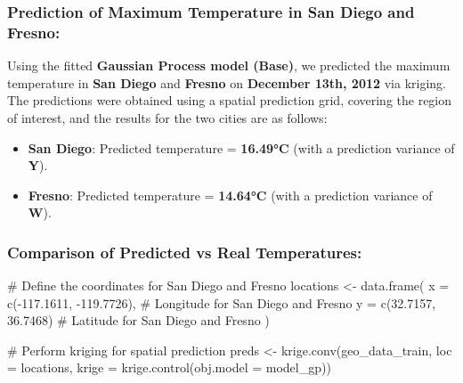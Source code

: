 \documentclass[
  11pt,
]{article}
\newenvironment{Shaded}{\begin{snugshade}}{\end{snugshade}}
\newcommand{\AttributeTok}[1]{\textcolor[rgb]{0.40,0.45,0.13}{#1}}
\newcommand{\CommentTok}[1]{\textcolor[rgb]{0.37,0.37,0.37}{#1}}
\newcommand{\FloatTok}[1]{\textcolor[rgb]{0.68,0.00,0.00}{#1}}
\newcommand{\FunctionTok}[1]{\textcolor[rgb]{0.28,0.35,0.67}{#1}}
\newcommand{\NormalTok}[1]{\textcolor[rgb]{0.00,0.23,0.31}{#1}}
\newcommand{\OtherTok}[1]{\textcolor[rgb]{0.00,0.23,0.31}{#1}}
\newcommand{\SpecialCharTok}[1]{\textcolor[rgb]{0.37,0.37,0.37}{#1}}
\begin{document}
\subsubsection{Prediction of Maximum Temperature in San Diego and
Fresno:}\label{prediction-of-maximum-temperature-in-san-diego-and-fresno}

Using the fitted \textbf{Gaussian Process model (Base)}, we predicted
the maximum temperature in \textbf{San Diego} and \textbf{Fresno} on
\textbf{December 13th, 2012} via kriging. The predictions were obtained
using a spatial prediction grid, covering the region of interest, and
the results for the two cities are as follows:

\begin{itemize}
\item
  \textbf{San Diego}: Predicted temperature = \textbf{16.49°C} (with a
  prediction variance of \textbf{Y}).
\item
  \textbf{Fresno}: Predicted temperature = \textbf{14.64°C} (with a
  prediction variance of \textbf{W}).
\end{itemize}

\subsubsection{Comparison of Predicted vs Real
Temperatures:}\label{comparison-of-predicted-vs-real-temperatures}

\begin{Shaded}
\begin{Highlighting}[]
\CommentTok{\# Define the coordinates for San Diego and Fresno}
\NormalTok{locations }\OtherTok{\textless{}{-}} \FunctionTok{data.frame}\NormalTok{(}
  \AttributeTok{x =} \FunctionTok{c}\NormalTok{(}\SpecialCharTok{{-}}\FloatTok{117.1611}\NormalTok{, }\SpecialCharTok{{-}}\FloatTok{119.7726}\NormalTok{),  }\CommentTok{\# Longitude for San Diego and Fresno}
  \AttributeTok{y =} \FunctionTok{c}\NormalTok{(}\FloatTok{32.7157}\NormalTok{, }\FloatTok{36.7468}\NormalTok{)       }\CommentTok{\# Latitude for San Diego and Fresno}
\NormalTok{)}

\CommentTok{\# Perform kriging for spatial prediction}
\NormalTok{preds }\OtherTok{\textless{}{-}} \FunctionTok{krige.conv}\NormalTok{(geo\_data\_train, }\AttributeTok{loc =}\NormalTok{ locations, }\AttributeTok{krige =} \FunctionTok{krige.control}\NormalTok{(}\AttributeTok{obj.model =}\NormalTok{ model\_gp))}
\end{Highlighting}
\end{Shaded}
\end{document}
